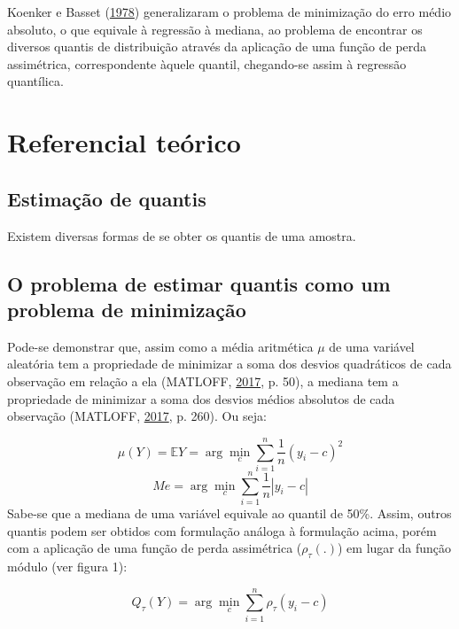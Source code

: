\documentclass[a4paper, 12pt]{article}
\begin{document}
Koenker e Basset (\protect\hyperlink{ref-koenker1978}{1978})
generalizaram o problema de minimização do erro médio absoluto, o que
equivale à regressão à mediana, ao problema de encontrar os diversos
quantis de distribuição através da aplicação de uma função de perda
assimétrica, correspondente àquele quantil, chegando-se assim à
regressão quantílica.

\hypertarget{referencial-teorico}{%
\section{Referencial teórico}\label{referencial-teorico}}

\hypertarget{estimacao-de-quantis}{%
\subsection{Estimação de quantis}\label{estimacao-de-quantis}}

Existem diversas formas de se obter os quantis de uma amostra.

\hypertarget{o-problema-de-estimar-quantis-como-um-problema-de-minimizacao}{%
\subsection{O problema de estimar quantis como um problema de
minimização}\label{o-problema-de-estimar-quantis-como-um-problema-de-minimizacao}}

Pode-se demonstrar que, assim como a média aritmética \(\mu\) de uma
variável aleatória tem a propriedade de minimizar a soma dos desvios
quadráticos de cada observação em relação a ela (MATLOFF,
\protect\hyperlink{ref-matloff2017}{2017}, p. 50), a mediana tem a
propriedade de minimizar a soma dos desvios médios absolutos de cada
observação (MATLOFF, \protect\hyperlink{ref-matloff2017}{2017}, p. 260).
Ou seja:

\[\mu(Y) = \mathbb{E}Y = \arg \min_c \sum_{i = 1}^n \frac{1}{n}(y_i - c)^2\]
\[Me = \arg \min_c \sum_{i = 1}^n \frac{1}{n}|y_i - c|\] Sabe-se que a
mediana de uma variável equivale ao quantil de 50\%. Assim, outros
quantis podem ser obtidos com formulação análoga à formulação acima,
porém com a aplicação de uma função de perda assimétrica
(\(\rho_\tau(.)\)) em lugar da função módulo (ver figura 1):

\[Q_\tau(Y) = \arg \min_c \sum_{i = 1}^n \rho_\tau(y_i - c)\]
\end{document}
